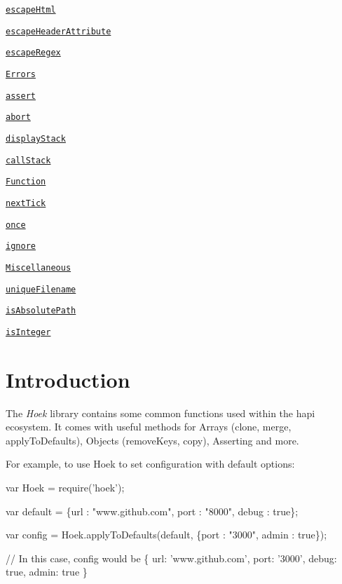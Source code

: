\begin{DoxyItemize}
\begin{DoxyItemize}
\item \href{#escapehtmlstring}{\tt escape\+Html}
\item \href{#escapeheaderattributeattribute}{\tt escape\+Header\+Attribute}
\item \href{#escaperegexstring}{\tt escape\+Regex}
\end{DoxyItemize}
\item \href{#errors}{\tt Errors}
\begin{DoxyItemize}
\item \href{#assertcondition-message}{\tt assert}
\item \href{#abortmessage}{\tt abort}
\item \href{#displaystackslice}{\tt display\+Stack}
\item \href{#callstackslice}{\tt call\+Stack}
\end{DoxyItemize}
\item \href{#function}{\tt Function}
\begin{DoxyItemize}
\item \href{#nexttickfn}{\tt next\+Tick}
\item \href{#oncefn}{\tt once}
\item \href{#ignore}{\tt ignore}
\end{DoxyItemize}
\item \href{#miscellaneous}{\tt Miscellaneous}
\begin{DoxyItemize}
\item \href{#uniquefilenamepath-extension}{\tt unique\+Filename}
\item \href{#isabsolutepathpath-platform}{\tt is\+Absolute\+Path}
\item \href{#isintegervalue}{\tt is\+Integer}
\end{DoxyItemize}
\end{DoxyItemize}

\section*{Introduction}

The {\itshape Hoek} library contains some common functions used within the hapi ecosystem. It comes with useful methods for Arrays (clone, merge, apply\+To\+Defaults), Objects (remove\+Keys, copy), Asserting and more.

For example, to use Hoek to set configuration with default options\+: 
\begin{DoxyCode}
var Hoek = require('hoek');

var default = \{url : "www.github.com", port : "8000", debug : true\};

var config = Hoek.applyToDefaults(default, \{port : "3000", admin : true\});

// In this case, config would be \{ url: 'www.github.com', port: '3000', debug: true, admin: true \}
\end{DoxyCode}



